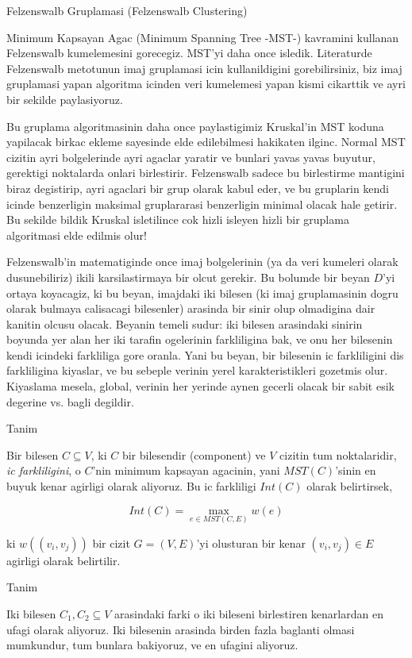 \documentclass[12pt,fleqn]{article}\usepackage{../common}
\begin{document}
Felzenswalb Gruplamasi (Felzenswalb Clustering)

Minimum Kapsayan Agac (Minimum Spanning Tree -MST-) kavramini kullanan
Felzenswalb kumelemesini gorecegiz. MST'yi daha once isledik. Literaturde
Felzenswalb metotunun imaj gruplamasi icin kullanildigini gorebilirsiniz,
biz imaj gruplamasi yapan algoritma icinden veri kumelemesi yapan kismi
cikarttik ve ayri bir sekilde paylasiyoruz.

Bu gruplama algoritmasinin daha once paylastigimiz Kruskal'in MST koduna
yapilacak birkac ekleme sayesinde elde edilebilmesi hakikaten
ilginc. Normal MST cizitin ayri bolgelerinde ayri agaclar yaratir ve
bunlari yavas yavas buyutur, gerektigi noktalarda onlari
birlestirir. Felzenswalb sadece bu birlestirme mantigini biraz degistirip,
ayri agaclari bir grup olarak kabul eder, ve bu gruplarin kendi icinde
benzerligin maksimal gruplararasi benzerligin minimal olacak hale
getirir. Bu sekilde bildik Kruskal isletilince cok hizli isleyen hizli bir
gruplama algoritmasi elde edilmis olur!

Felzenswalb'in matematiginde once imaj bolgelerinin (ya da veri kumeleri
olarak dusunebiliriz) ikili karsilastirmaya bir olcut gerekir. Bu bolumde
bir beyan $D$'yi ortaya koyacagiz, ki bu beyan, imajdaki iki bilesen (ki
imaj gruplamasinin dogru olarak bulmaya calisacagi bilesenler) arasinda bir
sinir olup olmadigina dair kanitin olcusu olacak. Beyanin temeli sudur: iki
bilesen arasindaki sinirin boyunda yer alan her iki tarafin ogelerinin
farkliligina bak, ve onu her bilesenin kendi icindeki farkliliga gore
oranla. Yani bu beyan, bir bilesenin ic farkliligini dis farkliligina
kiyaslar, ve bu sebeple verinin yerel karakteristikleri gozetmis
olur. Kiyaslama mesela, global, verinin her yerinde aynen gecerli olacak
bir sabit esik degerine vs. bagli degildir.

Tanim

Bir bilesen $C \subseteq V$, ki $C$ bir bilesendir (component) ve $V$ cizitin tum
noktalaridir, {\em ic farkliligini}, o $C$'nin minimum kapsayan agacinin,
yani $MST(C)$'sinin en buyuk kenar agirligi olarak aliyoruz. Bu ic farkliligi
$Int(C)$ olarak belirtirsek, 

$$ Int(C) = \max_{e \in MST(C,E)} w(e) $$

ki $w((v_i , v_j))$ bir cizit $G = (V,E)$'yi olusturan bir kenar $(v_i,v_j)
\in E$ agirligi 
olarak belirtilir. 

Tanim

Iki bilesen $C_1,C_2 \subseteq V$ arasindaki farki o iki bileseni
birlestiren kenarlardan en ufagi olarak aliyoruz. Iki bilesenin arasinda
birden fazla baglanti olmasi mumkundur, tum bunlara bakiyoruz, ve en
ufagini aliyoruz.
\end{document}
